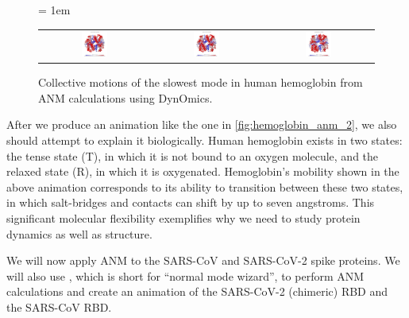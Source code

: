 \begin{figure}[h]
	\centering
	\tabcolsep = 1em
	\mySfFamily
	\begin{tabular}{c c c}
		\includegraphics[width = 0.25\textwidth]{../images/hemoglobin_animation1.png} & \includegraphics[width = 0.25\textwidth]{../images/hemoglobin_animation2.png} & \includegraphics[width = 0.25\textwidth]{../images/hemoglobin_animation3.png}
	\end{tabular}
	\caption{Collective motions of the slowest mode in human hemoglobin from ANM calculations using DynOmics.}
	\label{fig:hemoglobin_anm_2}
\end{figure}


After we produce an animation like the one in \autoref{fig:hemoglobin_anm_2}, we also should attempt to explain it biologically. Human hemoglobin exists in two states: the tense state (T), in which it is not bound to an oxygen molecule, and the relaxed state (R), in which it is oxygenated. Hemoglobin's mobility shown in the above animation corresponds to its ability to transition between these two states, in which salt-bridges and contacts can shift by up to seven angstroms. This significant molecular flexibility exemplifies why we need to study protein dynamics as well as structure.

We will now apply ANM to the SARS-CoV and SARS-CoV-2 spike proteins. We will also use \href{http://prody.csb.pitt.edu/nmwiz/}{}, which is short for ``normal mode wizard'', to perform ANM calculations and create an animation of the SARS-CoV-2 (chimeric) RBD and the SARS-CoV RBD. 

